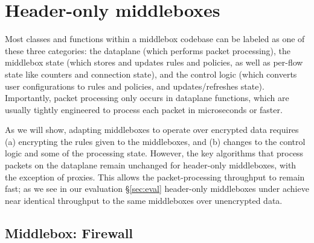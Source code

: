 \section{Header-only middleboxes}
\label{sec:homiddleboxes}
Most classes and functions within a middlebox codebase can be labeled as one of these three categories: the dataplane (which performs packet processing), the middlebox state (which stores and updates rules and policies, as well as per-flow state like counters and connection state), and the control logic (which converts user configurations to rules and policies, and updates/refreshes state). 
Importantly, packet processing only occurs in dataplane functions, which are usually tightly engineered to process each packet in microseconds or faster.

As we will show, adapting middleboxes to operate over encrypted data requires (a) encrypting the rules given to the middleboxes, and (b) changes to the control logic and some of the processing state. 
However, the key algorithms that process packets on the dataplane remain unchanged for header-only middleboxes, with the exception of proxies.
This allows the packet-processing throughput to remain fast; as we see in our evaluation \S\ref{sec:eval} header-only middleboxes under \sys achieve near identical throughput to the same middleboxes over unencrypted data. 

\subsection{Middlebox: Firewall}\label{sec:firewall}


